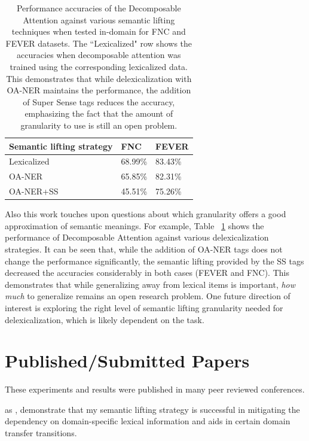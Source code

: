 \documentclass{article}
\begin{document}
\begin{table}[h!]
\begin{center}
\begin{tabular}{|p{20mm}|p{9mm}|p{10mm}|}
 \hline
\textbf{Semantic lifting strategy} & \textbf{FNC}  & \textbf{FEVER}  \\ 
\hline
Lexicalized &68.99\% &83.43\% \\
OA-NER &65.85\% &82.31\%\\
OA-NER+SS & 45.51\% &75.26\%\\
\hline
\end{tabular}
\end{center}
    \caption{Performance accuracies of the Decomposable Attention against various semantic lifting techniques when tested in-domain for FNC and FEVER datasets. The ``Lexicalized" row shows the accuracies when decomposable attention was trained using the corresponding lexicalized data. This demonstrates that while delexicalization with OA-NER maintains the performance, the addition of Super Sense tags reduces the accuracy, emphasizing the fact that the amount of granularity to use is still an open problem.}
    \label{sstag}
\end{table}


Also this work touches upon questions about which granularity offers a good approximation of semantic meanings. For example, Table ~\ref{sstag} shows the performance of Decomposable Attention against various delexicalization strategies. It can be seen that, while the addition of OA-NER tags does not change the performance significantly, the semantic lifting provided by the SS tags decreased the accuracies considerably in both cases (FEVER and FNC).  This demonstrates that while generalizing away from lexical items is important, {\em how much} to generalize remains an open research problem. One future direction of interest is exploring the right level of semantic lifting granularity needed for delexicalization, which is likely dependent on the task. 


\section{Published/Submitted Papers}

These experiments and results were published in many peer reviewed conferences.

as \citep*{emnlp2019sandeep}, demonstrate that my semantic lifting strategy is successful in mitigating the dependency on domain-specific lexical information and aids in certain domain transfer transitions. 
\end{document}
